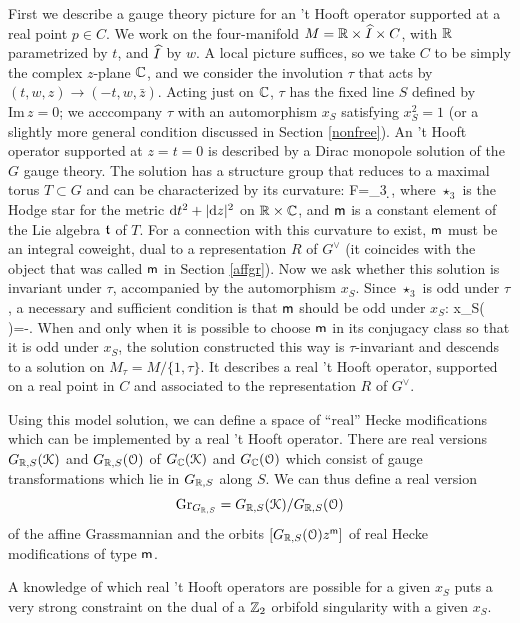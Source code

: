 \documentclass[11pt,a4paper]{article}
\begin{document}
First we describe a gauge theory picture for  an 't Hooft operator supported at a real point  $p\in C$.   We work on the four-manifold $M=\R\times \h I\times C$,
with $\R$ parametrized by $t$, and $\h I$ by $w$.   A local picture suffices, so we take $C$ to be simply the complex $z$-plane $\C$, and we consider the involution $\tau$
that acts by $(t,w,z)\to (-t,w,\bar z)$.  Acting just on $\C$, $\tau$ has the fixed line $S$ defined by ${\mathrm{Im}\, z}=0$; we acccompany $\tau$ with
an automorphism $x_S$  satisfying $x_S^2=1$ (or a slightly more general condition discussed in Section \ref{nonfree}).      An 't Hooft operator supported at $z=t=0$
is described by a Dirac monopole solution of the $G$ gauge theory.  The solution has a structure group that reduces to a maximal torus $T\subset G$
and can be characterized by its curvature:
\be\label{curv} F=\star_3 \d {}, \ee
where $\star_3 $ is the Hodge star for the metric $\d t^2+|\d z|^2$ on $\R\times\C$, and $\m$ is a constant element of the Lie algebra $\frak t$ of $T$.
For a connection with this curvature to exist, $\m$ must be an integral coweight, dual to a representation $R$ of $G^\vee$ (it coincides with the
object that was called $\m$ in Section \ref{affgr}).   Now we ask whether
this solution is invariant under $\tau$, accompanied by the automorphism $x_S$.   Since $\star_3$ is odd under $\tau$, a necessary
and sufficient condition is that $\m$ should be odd under $x_S$:
\be\label{oddurv} x_S( \m )=-\m. \ee
When and only when it is possible to choose $\m$ in its conjugacy class so that it is odd under $x_S$, the solution constructed this way is $\tau$-invariant
and descends to a solution on $M_\tau=M/\{1,\tau\}$.   It describes a real 't Hooft operator, supported on a real point in $C$ and associated to the representation
$R$ of $G^\vee$.  

Using this model solution, we can define a space of ``real'' Hecke modifications which can be implemented by a real 't Hooft operator.
There are real versions $G_{\R,S}({\cal K})$ and $G_{\R,S}({\cal O})$ of  $G_{\C}({\cal K})$ and $G_{\C}({\cal O})$ which consist of 
gauge transformations which lie in $G_{\R,S}$ along $S$. We can thus define a real version 
\begin{equation}
\Gr_{G_{\R,S}} = G_{\R,S}({\cal K})/G_{\R,S}({\cal O})
\end{equation}
of the affine Grassmannian and the orbits $\left[G_{\R,S}({\cal O}) z^\m\right]$ of real Hecke modifications of type $\m$. 

A knowledge of which real 't Hooft operators are possible for a given $x_S$ puts a very strong constraint on the dual of a $\Z_2$ orbifold singularity with a given $x_S$.
\end{document}

